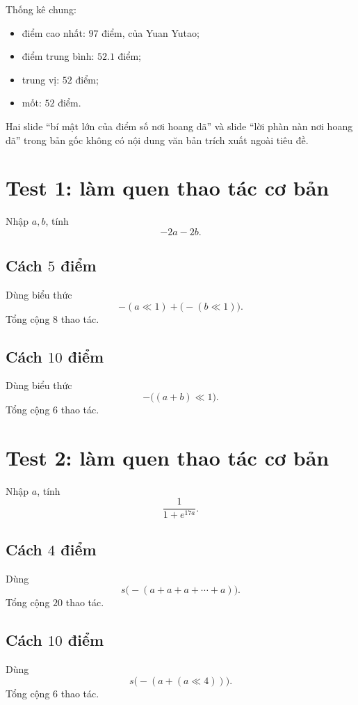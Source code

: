 \documentclass[11pt]{article}
\begin{document}
Thống kê chung:
\begin{itemize}
  \item điểm cao nhất: $97$ điểm, của Yuan Yutao;
  \item điểm trung bình: $52.1$ điểm;
  \item trung vị: $52$ điểm;
  \item mốt: $52$ điểm.
\end{itemize}

Hai slide ``bí mật lớn của điểm số nơi hoang dã'' và slide ``lời phàn nàn nơi
hoang dã'' trong bản gốc không có nội dung văn bản trích xuất ngoài tiêu đề.

\section{Test 1: làm quen thao tác cơ bản}

Nhập $a,b$, tính
\[
  -2a-2b.
\]

\subsection*{Cách $5$ điểm}

Dùng biểu thức
\[
  -(a\ll 1)+\bigl(-(b\ll 1)\bigr).
\]
Tổng cộng $8$ thao tác.

\subsection*{Cách $10$ điểm}

Dùng biểu thức
\[
  -\bigl((a+b)\ll 1\bigr).
\]
Tổng cộng $6$ thao tác.

\section{Test 2: làm quen thao tác cơ bản}

Nhập $a$, tính
\[
  \frac{1}{1+e^{17a}}.
\]

\subsection*{Cách $4$ điểm}

Dùng
\[
  s\bigl(-(a+a+a+\cdots+a)\bigr).
\]
Tổng cộng $20$ thao tác.

\subsection*{Cách $10$ điểm}

Dùng
\[
  s\bigl(-(a+(a\ll 4))\bigr).
\]
Tổng cộng $6$ thao tác.
\end{document}
